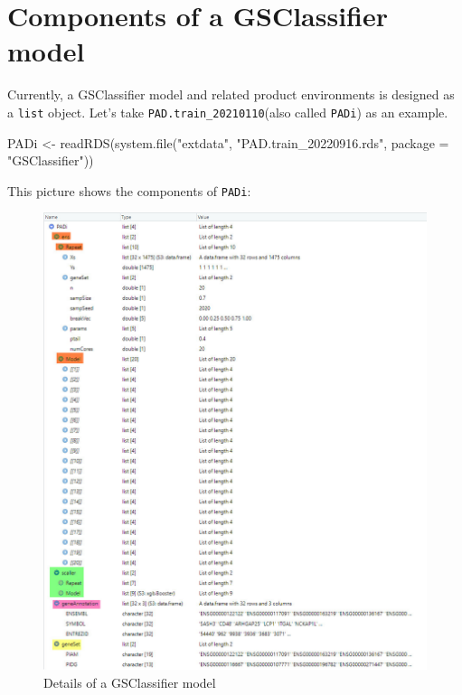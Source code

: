 \documentclass[
  12pt,
]{book}
\newenvironment{Shaded}{\begin{snugshade}}{\end{snugshade}}
\newcommand{\AttributeTok}[1]{\textcolor[rgb]{0.77,0.63,0.00}{#1}}
\newcommand{\FunctionTok}[1]{\textcolor[rgb]{0.00,0.00,0.00}{#1}}
\newcommand{\NormalTok}[1]{#1}
\newcommand{\OtherTok}[1]{\textcolor[rgb]{0.56,0.35,0.01}{#1}}
\newcommand{\StringTok}[1]{\textcolor[rgb]{0.31,0.60,0.02}{#1}}
\begin{document}
\hypertarget{components-of-a-gsclassifier-model}{%
\section{Components of a GSClassifier model}\label{components-of-a-gsclassifier-model}}

Currently, a GSClassifier model and related product environments is designed as a \texttt{list} object. Let's take \texttt{PAD.train\_20210110}(also called \texttt{PADi}) as an example.

\begin{Shaded}
\begin{Highlighting}[]
\NormalTok{PADi }\OtherTok{\textless{}{-}} \FunctionTok{readRDS}\NormalTok{(}\FunctionTok{system.file}\NormalTok{(}\StringTok{"extdata"}\NormalTok{, }\StringTok{"PAD.train\_20220916.rds"}\NormalTok{, }\AttributeTok{package =} \StringTok{"GSClassifier"}\NormalTok{)) }
\end{Highlighting}
\end{Shaded}

This picture shows the components of \texttt{PADi}:

\begin{figure}

{\centering \includegraphics[width=0.9\linewidth]{./fig/GSClassifier-model} 

}

\caption{Details of a GSClassifier model}\label{fig:GSClassifierModel}
\end{figure}
\end{document}
